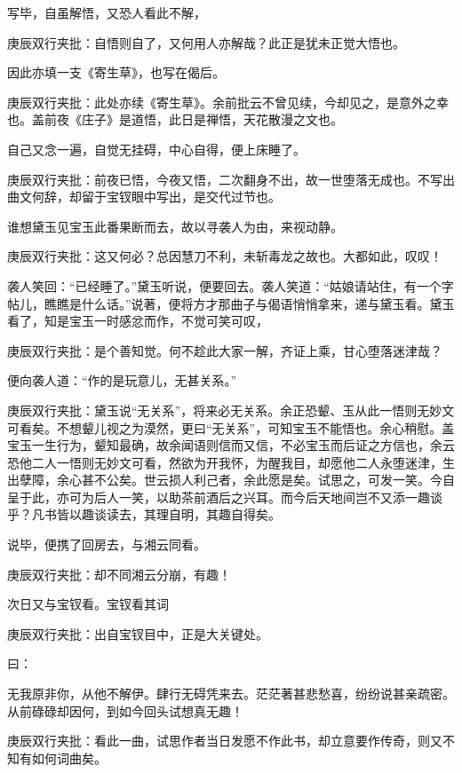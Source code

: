 \begin{parag}
    写毕，自虽解悟，又恐人看此不解，\begin{note}庚辰双行夹批：自悟则自了，又何用人亦解哉？此正是犹未正觉大悟也。\end{note}因此亦填一支《寄生草》，也写在偈后。\begin{note}庚辰双行夹批：此处亦续《寄生草》。余前批云不曾见续，今却见之，是意外之幸也。盖前夜《庄子》是道悟，此日是禅悟，天花散漫之文也。\end{note}自己又念一遍，自觉无挂碍，中心自得，便上床睡了。\begin{note}庚辰双行夹批：前夜已悟，今夜又悟，二次翻身不出，故一世堕落无成也。不写出曲文何辞，却留于宝钗眼中写出，是交代过节也。\end{note}
\end{parag}


\begin{parag}
    谁想黛玉见宝玉此番果断而去，故以寻袭人为由，来视动静。\begin{note}庚辰双行夹批：这又何必？总因慧刀不利，未斩毒龙之故也。大都如此，叹叹！\end{note}袭人笑回：“已经睡了。”黛玉听说，便要回去。袭人笑道：“姑娘请站住，有一个字帖儿，瞧瞧是什么话。”说著，便将方才那曲子与偈语悄悄拿来，递与黛玉看。黛玉看了，知是宝玉一时感忿而作，不觉可笑可叹，\begin{note}庚辰双行夹批：是个善知觉。何不趁此大家一解，齐证上乘，甘心堕落迷津哉？\end{note}便向袭人道：“作的是玩意儿，无甚关系。”\begin{note}庚辰双行夹批：黛玉说“无关系”，将来必无关系。余正恐颦、玉从此一悟则无妙文可看矣。不想颦儿视之为漠然，更曰“无关系”，可知宝玉不能悟也。余心稍慰。盖宝玉一生行为，颦知最确，故余闻语则信而又信，不必宝玉而后证之方信也，余云恐他二人一悟则无妙文可看，然欲为开我怀，为醒我目，却愿他二人永堕迷津，生出孽障，余心甚不公矣。世云损人利己者，余此愿是矣。试思之，可发一笑。今自呈于此，亦可为后人一笑，以助茶前酒后之兴耳。而今后天地间岂不又添一趣谈乎？凡书皆以趣谈读去，其理自明，其趣自得矣。\end{note}说毕，便携了回房去，与湘云同看。\begin{note}庚辰双行夹批：却不同湘云分崩，有趣！\end{note}次日又与宝钗看。宝钗看其词\begin{note}庚辰双行夹批：出自宝钗目中，正是大关键处。\end{note}曰：
\end{parag}


\begin{parag}
    无我原非你，从他不解伊。肆行无碍凭来去。茫茫著甚悲愁喜，纷纷说甚亲疏密。从前碌碌却因何，到如今回头试想真无趣！\begin{note}庚辰双行夹批：看此一曲，试思作者当日发愿不作此书，却立意要作传奇，则又不知有如何词曲矣。\end{note}
\end{parag}


